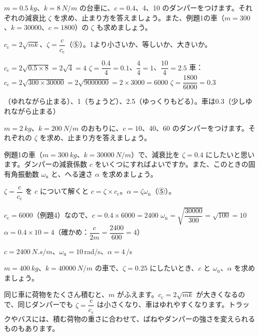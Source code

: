\begin{reidai}
$m=\qty{0.5}{kg}$、$k=\qty{8}{N/m}$ の台車に、$c=0.4$、4、10 のダンパーをつけます。それぞれの減衰比 $\zeta$ を求め、止まり方を答えましょう。また、例題1の車（$m=300$、$k=\num{30000}$、$c=1800$）の $\zeta$ も求めましょう。\par
\kangaekata $c_{\mathrm c}=2\sqrt{mk}$、$\zeta=\dfrac{c}{c_{\mathrm c}}$（⑤）。1より小さいか、等しいか、大きいか。\par
\shiki
\kviha $c_{\mathrm c}=2\sqrt{0.5\times8}=2\sqrt4=4$
\kviha $\zeta=\dfrac{0.4}{4}=0.1$、\quad$\dfrac{4}{4}=1$、\quad$\dfrac{10}{4}=2.5$
\kviha 車：$c_{\mathrm c}=2\sqrt{300\times30000}=2\sqrt{9000000}=2\times3000=6000$
\kvihb $\zeta=\dfrac{1800}{6000}=0.3$\par
{}（ゆれながら止まる）、1（ちょうど）、2.5（ゆっくりもどる）。車は0.3（少しゆれながら止まる）
\end{reidai}

\begin{jibun}
$m=\qty{2}{kg}$、$k=\qty{200}{N/m}$ のおもりに、$c=10$、40、60 のダンパーをつけます。それぞれの $\zeta$ を求め、止まり方を答えましょう。
\end{jibun}

\begin{reidai}[ほしい減衰比にするダンパーを選ぶ]
例題1の車（$m=\qty{300}{kg}$、$k=\qty{30000}{N/m}$）で、減衰比を $\zeta=0.4$ にしたいと思います。ダンパーの減衰係数 $c$ をいくつにすればよいですか。また、このときの固有角振動数 $\omega_{\mathrm n}$ と、へる速さ $\alpha$ を求めましょう。\par
\kangaekata $\zeta=\dfrac{c}{c_{\mathrm c}}$ を $c$ について解くと $c=\zeta\times c_{\mathrm c}$。$\alpha=\zeta\omega_{\mathrm n}$（⑤）。\par
\shiki
\kviha $c_{\mathrm c}=6000$（例題4）なので、$c=0.4\times6000=2400$
\kviha $\omega_{\mathrm n}=\sqrt{\dfrac{30000}{300}}=\sqrt{100}=10$
\kviha $\alpha=0.4\times10=4$（確かめ：$\dfrac{c}{2m}=\dfrac{2400}{600}=4$）\par
\kotae $c=\qty{2400}{N.s/m}$、$\omega_{\mathrm n}=10$\,rad/s、$\alpha=4$\,/s
\end{reidai}

\begin{jibun}
$m=\qty{400}{kg}$、$k=\qty{40000}{N/m}$ の車で、$\zeta=0.25$ にしたいとき、$c$ と $\omega_{\mathrm n}$、$\alpha$ を求めましょう。
\end{jibun}
同じ車に荷物をたくさん積むと、$m$ がふえます。$c_{\mathrm c}=2\sqrt{mk}$ が大きくなるので、同じダンパーでも $\zeta=\dfrac{c}{c_{\mathrm c}}$ は小さくなり、車はゆれやすくなります。トラックやバスには、積む荷物の重さに合わせて、ばねやダンパーの強さを変えられるものもあります。

